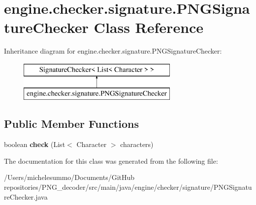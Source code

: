 \hypertarget{classengine_1_1checker_1_1signature_1_1_p_n_g_signature_checker}{\section{engine.\-checker.\-signature.\-P\-N\-G\-Signature\-Checker Class Reference}
\label{classengine_1_1checker_1_1signature_1_1_p_n_g_signature_checker}
}
Inheritance diagram for engine.\-checker.\-signature.\-P\-N\-G\-Signature\-Checker\-:\begin{figure}[H]
\begin{center}
\leavevmode
\includegraphics[height=2.000000cm]{classengine_1_1checker_1_1signature_1_1_p_n_g_signature_checker}
\end{center}
\end{figure}
\subsection*{Public Member Functions}
\begin{DoxyCompactItemize}
\item 
\hypertarget{classengine_1_1checker_1_1signature_1_1_p_n_g_signature_checker_a9d20acae12842121ca54312c5e118947}{boolean {\bfseries check} (List$<$ Character $>$ characters)}\label{classengine_1_1checker_1_1signature_1_1_p_n_g_signature_checker_a9d20acae12842121ca54312c5e118947}

\end{DoxyCompactItemize}


The documentation for this class was generated from the following file\-:\begin{DoxyCompactItemize}
\item 
/\-Users/michelesummo/\-Documents/\-Git\-Hub repositories/\-P\-N\-G\-\_\-decoder/src/main/java/engine/checker/signature/P\-N\-G\-Signature\-Checker.\-java\end{DoxyCompactItemize}
